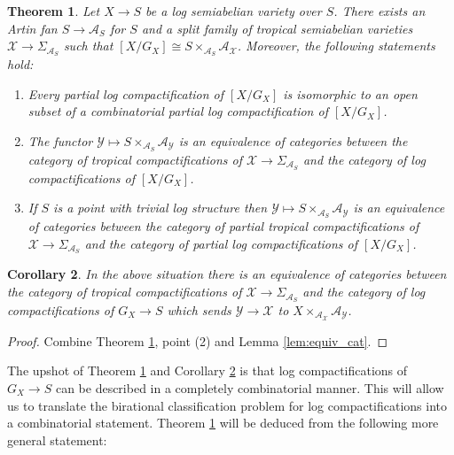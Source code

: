 \documentclass[11pt]{amsart}
\newtheorem{theorem}{Theorem}[section]
\newtheorem{corollary}[theorem]{Corollary}
\theoremstyle{definition}
\theoremstyle{remark}
\begin{document}
\begin{theorem}
	\label{thm:trop_corresp}
	Let $X\to S$ be a log semiabelian variety over $S$. There exists an Artin fan $S\to \mathcal{A}_S$ for $S$
	and a split family of tropical semiabelian varieties $\mathcal{X}\to \Sigma_{\mathcal{A}_S}$ such that
	$[X/G_X]\cong S\times_{\mathcal{A}_S}\mathcal{A}_{\mathcal{X}}$. Moreover, the following statements hold:
	\begin{enumerate}
		\item Every partial log compactification of $[X/G_X]$ is isomorphic to an open subset of a combinatorial partial log compactification of $[X/G_X]$.
		\item The functor $\mathcal{Y}\mapsto S\times_{\mathcal{A}_S}\mathcal{A}_{\mathcal{Y}}$ is an equivalence of categories between
			the category of tropical compactifications of $\mathcal{X}\to \Sigma_{\mathcal{A}_S}$
			and the category of log compactifications of $[X/G_X]$.
		\item If $S$ is a point with trivial log structure then $\mathcal{Y}\mapsto S\times_{\mathcal{A}_S}\mathcal{A}_{\mathcal{Y}}$ is an
			equivalence of categories between the category of partial tropical compactifications of $\mathcal{X}\to \Sigma_{\mathcal{A}_S}$
			and the category of partial log compactifications of $[X/G_X]$.
	\end{enumerate}
\end{theorem}

\begin{corollary}
	\label{cor:trop_corresp_log}
	In the above situation there is an equivalence of categories between the category of tropical compactifications
	of $\mathcal{X}\to \Sigma_{\mathcal{A}_S}$ and the category of log compactifications
	of $G_X\to S$ which sends $\mathcal{Y}\to \mathcal{X}$ to $X\times_{\mathcal{A}_{\mathcal{X}}}\mathcal{A}_{\mathcal{Y}}$.
\end{corollary}

\begin{proof}
	Combine Theorem \ref{thm:trop_corresp}, point (2) and Lemma \ref{lem:equiv_cat}.
\end{proof}

The upshot of Theorem \ref{thm:trop_corresp} and Corollary \ref{cor:trop_corresp_log} is that log compactifications
of $G_X\to S$ can be described in a completely combinatorial manner. This will allow us to translate the birational
classification problem for log compactifications into a combinatorial statement.
Theorem \ref{thm:trop_corresp} will be deduced from the following more general statement:
\end{document}
